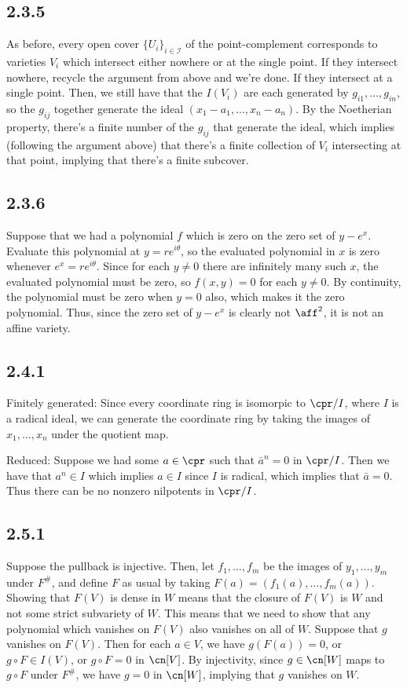 \documentclass{article}
\begin{document}
\subsection*{2.3.5}
As before, every open cover $\{U_i\}_{i\in\mathscr{I}}$ of the point-complement corresponds to varieties $V_i$ which intersect either nowhere or at the single point. If they intersect nowhere, recycle the argument from above and we're done. If they intersect at a single point. Then, we still have that the $I(V_i)$ are each generated by $g_{i1},\ldots,g_{in}$, so the $g_{ij}$ together generate the ideal $(x_1-a_1,\ldots,x_n-a_n)$. By the Noetherian property, there's a finite number of the $g_{ij}$ that generate the ideal, which implies (following the argument above) that there's a finite collection of $V_i$ intersecting at that point, implying that there's a finite subcover.
\subsection*{2.3.6}
Suppose that we had a polynomial $f$ which is zero on the zero set of $y-e^x$. Evaluate this polynomial at $y=re^{i\theta}$, so the evaluated polynomial in $x$ is zero whenever $e^x=re^{i\theta}$. Since for each $y\neq0$ there are infinitely many such $x$, the evaluated polynomial must be zero, so $f(x,y)=0$ for each $y\neq 0$. By continuity, the polynomial must be zero when $y=0$ also, which makes it the zero polynomial. Thus, since the zero set of $y-e^x$ is clearly not $\aff^2$, it is not an affine variety.
\subsection*{2.4.1}
Finitely generated: Since every coordinate ring is isomorpic to $\cpr/I$, where $I$ is a radical ideal, we can generate the coordinate ring by taking the images of $x_1,\ldots,x_n$ under the quotient map.

Reduced: Suppose we had some $a\in\cpr$ such that $\bar{a}^n=0$ in $\cpr/I$. Then we have that $a^n\in I$ which implies $a\in I$ since $I$ is radical, which implies that $\bar{a}=0$. Thus there can be no nonzero nilpotents in $\cpr/I$.
\subsection*{2.5.1}
Suppose the pullback is injective. Then, let $f_1,\ldots,f_m$ be the images of $y_1,\ldots,y_m$ under $F^\#$, and define $F$ as usual by taking $F(a)=(f_1(a),\ldots,f_m(a))$. Showing that $F(V)$ is dense in $W$ means that the closure of $F(V)$ is $W$ and not some strict subvariety of $W$. This means that we need to show that any polynomial which vanishes on $F(V)$ also vanishes on all of $W$. Suppose that $g$ vanishes on $F(V)$. Then for each $a\in V$, we have $g(F(a))=0$, or $g\circ F\in I(V)$, or $g\circ F=0$ in $\cn[V]$. By injectivity, since $g\in\cn[W]$ maps to $g\circ F$ under $F^\#$, we have $g=0$ in $\cn[W]$, implying that $g$ vanishes on $W$.
\end{document}
